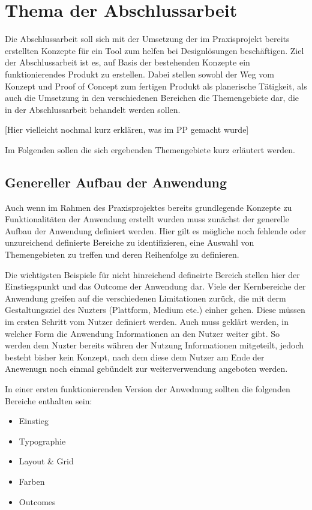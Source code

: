 \section{Thema der Abschlussarbeit}
Die Abschlussarbeit soll sich mit der Umsetzung der im Praxisprojekt bereits erstellten Konzepte für ein Tool zum helfen bei Designlösungen beschäftigen. Ziel der Abschlussarbeit ist es, auf Basis der bestehenden Konzepte ein funktionierendes Produkt zu erstellen.
Dabei stellen sowohl der Weg vom Konzept und Proof of Concept zum fertigen Produkt als planerische Tätigkeit, als auch die Umsetzung in den verschiedenen Bereichen die Themengebiete dar, die in der Abschlussarbeit behandelt werden sollen.

[Hier vielleicht nochmal kurz erklären, was im PP gemacht wurde]

Im Folgenden sollen die sich ergebenden Themengebiete kurz erläutert werden.

\subsection{Genereller Aufbau der Anwendung}
Auch wenn im Rahmen des Praxisprojektes bereits grundlegende Konzepte zu Funktionalitäten der Anwendung erstellt wurden muss zunächst der generelle Aufbau der Anwendung definiert werden.
Hier gilt es mögliche noch fehlende oder unzureichend definierte Bereiche zu identifizieren, eine Auswahl von Themengebieten zu treffen und deren Reihenfolge zu definieren.

Die wichtigsten Beispiele für nicht hinreichend defineirte Bereich stellen hier der Einstiegspunkt und das Outcome der Anwendung dar.
Viele der Kernbereiche der Anwendung greifen auf die verschiedenen Limitationen zurück, die mit derm Gestaltungsziel des Nuzters (Plattform, Medium etc.) einher gehen. Diese müssen im ersten Schritt vom Nutzer definiert werden.
Auch muss geklärt werden, in welcher Form die Anwendung Informationen an den Nutzer weiter gibt. So werden dem Nuzter bereits währen der Nutzung Informationen mitgeteilt, jedoch besteht bisher kein Konzept, nach dem diese dem Nutzer am Ende der Anewenugn noch einmal gebündelt zur weiterverwendung angeboten werden.

In einer ersten funktionierenden Version der Anwednung sollten die folgenden Bereiche enthalten sein:

\begin{itemize}
  \item Einstieg
  \item Typographie
  \item Layout \& Grid
  \item Farben
  \item Outcomes
\end{itemize}

